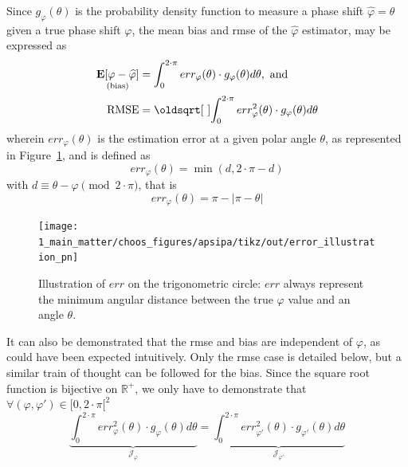 Since $g_\varphi(\theta)$ is the probability density function to measure a phase shift $\widehat{\varphi}=\theta$ given a true phase shift $\varphi$, the mean bias and \gls{rmse} of the $\widehat{\varphi}$ estimator, may be expressed as
\begin{equation}\label{eq:choos:apsipa:rmse_def}
	\begin{aligned}
		\underset{\mathrm{(bias)}}{\esp{\left[\varphi - \widehat{\varphi}\right]}} &= \int_{0}^{2\cdot \pi} err_\varphi(\theta) \cdot g_\varphi(\theta) d\theta,\ \mathrm{and} \\
		\text{RMSE} &= \sqrt{\int_{0}^{2\cdot \pi} err_\varphi^2(\theta) \cdot g_\varphi(\theta) d\theta}
	\end{aligned}
\end{equation}
wherein $err_\varphi(\theta)$ is the estimation error at a given polar angle $\theta$, as represented in Figure~\ref{fig:choos:apsipa:error_illustration}, and is defined as
\begin{equation}
	err_\varphi(\theta) = \min \left(d, 2\cdot \pi - d\right)
\end{equation}
with $d \equiv \theta - \varphi \pmod{2\cdot\pi}$, that is
\begin{equation}
	err_\varphi(\theta) = \pi - |\pi - \theta|
\end{equation}

\begin{figure}
	\centering
	\texttt{[image: 1\_main\_matter/choos\_figures/apsipa/tikz/out/error\_illustration\_pn]}
	\caption[Illustration of $err$ on the trigonometric circle.]{Illustration of $err$ on the trigonometric circle: $err$ always represent the minimum angular distance between the true $\varphi$ value and an angle $\theta$.}
	\label{fig:choos:apsipa:error_illustration}
\end{figure}

It can also be demonstrated that the \gls{rmse} and bias are independent of $\varphi$, as could have been expected intuitively. Only the \gls{rmse} case is detailed below, but a similar train of thought can be followed for the bias. Since the square root function is bijective on $\mathbb{R}^+$, we only have to demonstrate that $\forall (\varphi,\varphi') \in [0, 2 \cdot \pi[^2$
\begin{equation}
	\underbrace{\int_{0}^{2\cdot \pi} err_\varphi^2(\theta) \cdot g_\varphi(\theta) d\theta}_{\mathcal{J_\varphi}} = \underbrace{\int_{0}^{2\cdot \pi} err_{\varphi'}^2(\theta) \cdot g_{\varphi'}(\theta) d\theta}_{\mathcal{J_{\varphi'}}}
\end{equation}

